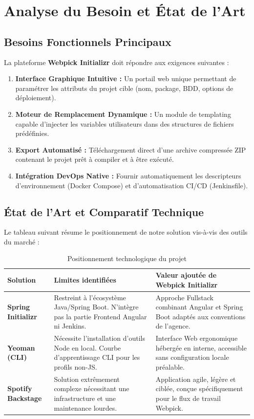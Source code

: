 \documentclass[12pt,a4paper]{article}
\begin{document}
\section{Analyse du Besoin et État de l'Art}

\subsection{Besoins Fonctionnels Principaux}
La plateforme \textbf{Webpick Initializr} doit répondre aux exigences suivantes :
\begin{enumerate}
    \item \textbf{Interface Graphique Intuitive :} Un portail web unique permettant de paramétrer les attributs du projet cible (nom, package, BDD, options de déploiement).
    \item \textbf{Moteur de Remplacement Dynamique :} Un module de templating capable d'injecter les variables utilisateurs dans des structures de fichiers prédéfinies.
    \item \textbf{Export Automatisé :} Téléchargement direct d'une archive compressée ZIP contenant le projet prêt à compiler et à être exécuté.
    \item \textbf{Intégration DevOps Native :} Fournir automatiquement les descripteurs d'environnement (Docker Compose) et d'automatisation CI/CD (Jenkinsfile).
\end{enumerate}

\subsection{État de l'Art et Comparatif Technique}
Le tableau suivant résume le positionnement de notre solution vis-à-vis des outils du marché :

\begin{table}[H]
\centering
\small
\renewcommand{\arraystretch}{1.4}
\begin{tabularx}{\textwidth}{>{\bfseries\color{primary}}l >{\raggedright\arraybackslash}X >{\raggedright\arraybackslash}X}
\toprule
\textbf{Solution} & \textbf{Limites identifiées} & \textbf{Valeur ajoutée de Webpick Initializr} \\
\midrule
Spring Initializr & Restreint à l'écosystème Java/Spring Boot. N'intègre pas la partie Frontend Angular ni Jenkins. & Approche Fullstack combinant Angular et Spring Boot adaptés aux conventions de l'agence. \\
Yeoman (CLI) & Nécessite l'installation d'outils Node en local. Courbe d'apprentissage CLI pour les profils non-JS. & Interface Web ergonomique hébergée en interne, accessible sans configuration locale préalable. \\
Spotify Backstage & Solution extrêmement complexe nécessitant une infrastructure et une maintenance lourdes. & Application agile, légère et ciblée, conçue spécifiquement pour le flux de travail Webpick. \\
\bottomrule
\end{tabularx}
\caption{Positionnement technologique du projet}
\end{table}
\end{document}
